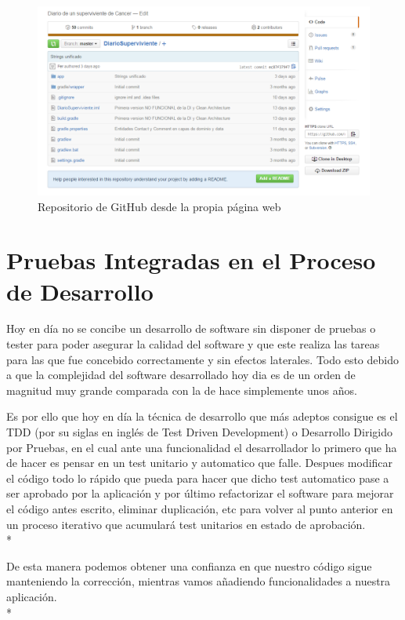 \documentclass[../pfc.tex]{subfiles}
\begin{document}
	\begin{figure}[H]
		\centering
		\includegraphics[width=1\linewidth]{../images/githubDiarioSuperviviente}
		\caption{Repositorio de GitHub desde la propia página web }
		\label{fig:ghweb}
	\end{figure}

	\clearpage
	
	\section{Pruebas Integradas en el Proceso de Desarrollo}
	
	Hoy en día no se concibe un desarrollo de software sin disponer de pruebas o tester para poder asegurar la calidad del software y que este realiza las tareas para las que fue concebido correctamente y sin efectos laterales. Todo esto debido a que la complejidad del software desarrollado hoy dia es de un orden de magnitud muy grande comparada con la de hace simplemente unos años.
	
	Es por ello que hoy en día la técnica de desarrollo que más adeptos consigue es el TDD (por su siglas en inglés de Test Driven Development) o Desarrollo Dirigido por Pruebas, en el cual ante una funcionalidad el desarrollador lo primero que ha de hacer es pensar en un test unitario y automatico que falle. Despues modificar el código todo lo rápido que pueda para hacer que dicho test automatico pase a ser aprobado por la aplicación y por último refactorizar el software para mejorar el código antes escrito, eliminar duplicación, etc para volver al punto anterior en un proceso iterativo que acumulará test unitarios en estado de aprobación.\\* 
	
	De esta manera podemos obtener una confianza en que nuestro código sigue manteniendo la corrección, mientras vamos añadiendo funcionalidades a nuestra aplicación.\\*
	
\end{document}
